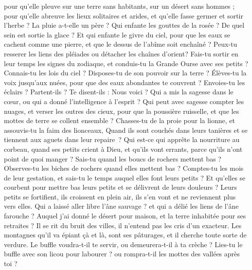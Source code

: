 \begin{multicols}{2}
pour qu'elle pleuve sur une terre sans habitants, sur un désert sans hommes ;
pour qu'elle abreuve les lieux solitaires et arides, et qu'elle fasse germer et sortir l'herbe ?
La pluie a-t-elle un père ? Qui enfante les gouttes de la rosée ?
De quel sein est sortie la glace ? Et qui enfante le givre du ciel,
pour que les eaux se cachent comme une pierre, et que le dessus de l'abîme soit enchaîné ?
Peux-tu resserer les liens des pléiades ou détacher les chaînes d'orient?
Fais-tu sortir en leur temps les signes du zodiaque, et conduis-tu la Grande Ourse avec ses petits ?
Connais-tu les lois du ciel ? Disposes-tu de son pouvoir sur la terre ?
Élèves-tu la voix jusqu'aux nuées, pour que des eaux abondantes te couvrent ?
Envoies-tu les éclairs ? Partent-ils ? Te disent-ils : Nous voici ?
Qui a mis la sagesse dans le cœur, ou qui a donné l'intelligence à l'esprit ?
Qui peut avec sagesse compter les nuages, et verser les outres des cieux,
pour que la poussière ruisselle, et que les mottes de terre se collent ensemble ?
\VerseOne{}Chasses-tu de la proie pour la lionne, et assouvis-tu la faim des lionceaux,
Quand ils sont couchés dans leurs tanières et se tiennent aux aguets dans leur repaire ?
Qui est-ce qui apprête la nourriture au corbeau, quand ses petits crient à Dieu, et qu'ils vont errants, parce qu'ils n'ont point de quoi manger ?
Sais-tu quand les boucs de rochers mettent bas ? Observes-tu les biches de rochers quand elles mettent bas ?
Comptes-tu les mois de leur gestation, et sais-tu le temps auquel elles font leurs petits ?
Et qu'elles se courbent pour mettre bas leurs petits et se délivrent de leurs douleurs ?
Leurs petits se fortifient, ils croissent en plein air, ils s’en vont et ne reviennent plus vers elles.
Qui a laissé aller libre l’âne sauvage ? et qui a délié les liens de l’âne farouche ?
Auquel j’ai donné le désert pour maison, et la terre inhabitée pour ses retraites ?
Il se rit du bruit des villes, il n'entend pas les cris d'un exacteur.
Les montagnes qu'il va épiant çà et là, sont ses pâturages, et il cherche toute sorte de verdure. 
Le buffle voudra-t-il te servir, ou demeurera-t-il à ta crèche ? 
Lies-tu le buffle avec son licou pour labourer ? ou rompra-t-il les mottes des vallées après toi ? 

\end{multicols}
